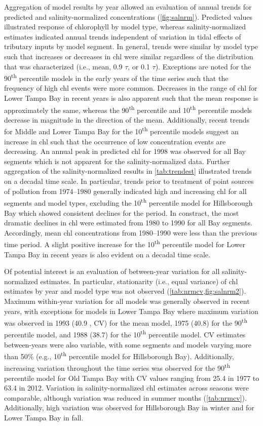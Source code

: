 \documentclass[letterpaper,12pt,oneside]{article}\usepackage{graphicx, color}
\newcommand{\nine}{90\textsuperscript{th} percentile }
\newcommand{\ten}{10\textsuperscript{th} percentile }
\begin{document}
Aggregation of model results by year allowed an evaluation of annual trends for predicted and salinity-normalized concentrations (\cref{fig:salnrm}).  Predicted values illustrated response of chlorophyll by model type, whereas salinity-normalized estimates indicated annual trends independent of variation in tidal effects of tributary inputs by model segment.  In general, trends were similar by model type such that increases or decreases in \ac{chl} were similar regardless of the distribution that was characterized (i.e., mean, 0.9 $\tau$, or 0.1 $\tau$).  Exceptions are noted for the \nine models in the early years of the time series such that the frequency of high \ac{chl} events were more common.  Decreases in the range of \ac{chl} for Lower Tampa Bay in recent years is also apparent such that the mean response is approximately the same, whereas the \nine and \ten models decrease in magnitude in the direction of the mean.  Additionally, recent trends for Middle and Lower Tampa Bay for the \ten models suggest an increase in \ac{chl} such that the occurrence of low concentration events are decreasing.  An annual peak in predicted \ac{chl} for 1998 was observed for all Bay segments which is not apparent for the salinity-normalized data. Further aggregation of the salinity-normalized results in \cref{tab:trendest} illustrated trends on a decadal time scale.  In particular, trends prior to treatment of point sources of pollution from 1974--1980 generally indicated high and increasing \ac{chl} for all segments and model types, excluding the \ten model for Hillsborough Bay which showed consistent declines for the period.  In constract, the most dramatic declines in \ac{chl} were estimated from 1980 to 1990 for all Bay segments.  Accordingly, mean \ac{chl} concentrations from 1980--1990 were less than the previous time period.  A slight positive increase for the \ten model for Lower Tampa Bay in recent years is also evident on a decadal time scale.   

Of potential interest is an evaluation of between-year variation for all salinity-normalized estimates.  In particular, stationarity (i.e., equal variance) of \ac{chl} estimates by year and model type was not observed (\cref{tab:nrmcv,fig:salnrm2}).  Maximum within-year variation for all models was generally observed in recent years, with exceptions for models in Lower Tampa Bay where maximum variation was observed in 1993 (40.9 , \ac{CV}) for the mean model, 1975 (40.8) for the \nine model, and 1988 (38.7) for the \ten model.  \ac{CV} estimates between-years were also variable, with some segments and models varying more than 50\% (e.g., \ten model for Hillsborough Bay).  Additionally, increasing variation throughout the time series was observed for the \nine model for Old Tampa Bay with \ac{CV} values ranging from 25.4 in 1977  to 63.4 in 2012.  Variation in salinity-normalized \ac{chl} estimates across seasons were comparable, although variation was reduced in summer months (\cref{tab:nrmcv}).  Additionally, high variation was observed for Hillsborough Bay in winter and for Lower Tampa Bay in fall.
\end{document}

